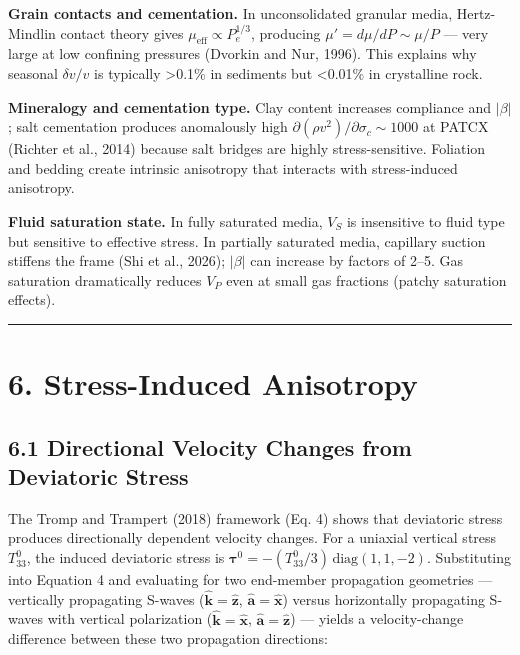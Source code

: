 \documentclass[draft]{agujournal2019}
\begin{document}
\textbf{Grain contacts and cementation.} In unconsolidated granular
media, Hertz-Mindlin contact theory gives
\(\mu_{\text{eff}} \propto P_e^{1/3}\), producing
\(\mu' = d\mu/dP \sim \mu/P\) --- very large at low confining pressures
(Dvorkin and Nur, 1996). This explains why seasonal \(\delta v/v\) is
typically \textgreater{}0.1\% in sediments but \textless{}0.01\% in
crystalline rock.

\textbf{Mineralogy and cementation type.} Clay content increases
compliance and \(|\beta|\); salt cementation produces anomalously high
\(\partial(\rho v^2)/\partial\sigma_c \sim 1000\) at PATCX (Richter et
al., 2014) because salt bridges are highly stress-sensitive. Foliation
and bedding create intrinsic anisotropy that interacts with
stress-induced anisotropy.

\textbf{Fluid saturation state.} In fully saturated media, \(V_S\) is
insensitive to fluid type but sensitive to effective stress. In
partially saturated media, capillary suction stiffens the frame (Shi et
al., 2026); \(|\beta|\) can increase by factors of 2--5. Gas saturation
dramatically reduces \(V_P\) even at small gas fractions (patchy
saturation effects).

\begin{center}\rule{0.5\linewidth}{0.5pt}\end{center}

\section{6. Stress-Induced Anisotropy}\label{stress-induced-anisotropy}

\subsection{6.1 Directional Velocity Changes from Deviatoric
Stress}\label{directional-velocity-changes-from-deviatoric-stress}

The Tromp and Trampert (2018) framework (Eq. 4) shows that deviatoric
stress produces directionally dependent velocity changes. For a uniaxial
vertical stress \(T_{33}^0\), the induced deviatoric stress is
\(\boldsymbol{\tau}^0 = -(T_{33}^0/3)\,\text{diag}(1,1,-2)\).
Substituting into Equation 4 and evaluating for two end-member
propagation geometries --- vertically propagating S-waves
(\(\hat{\mathbf{k}} = \hat{\mathbf{z}}\),
\(\hat{\mathbf{a}} = \hat{\mathbf{x}}\)) versus horizontally propagating
S-waves with vertical polarization
(\(\hat{\mathbf{k}} = \hat{\mathbf{x}}\),
\(\hat{\mathbf{a}} = \hat{\mathbf{z}}\)) --- yields a velocity-change
difference between these two propagation directions:
\end{document}

